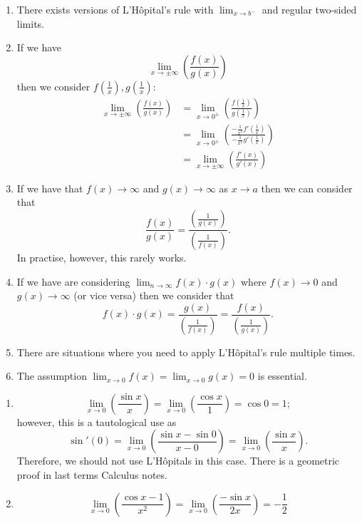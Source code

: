 \begin{remark}
    \begin{enumerate}
        \item There exists versions of L'H\^{o}pital's rule with $\lim_{x \to b^-}$ and regular two-sided limits.
        
        \item If we have \[ \lim_{x \to \pm \infty} \left( \frac{f(x)}{g(x)} \right) \] then we consider $f \left( \frac{1}{x} \right), g \left( \frac{1}{x} \right)$:
        \begin{align*}
            \lim_{x \to \pm \infty} \left( \frac{f(x)}{g(x)} \right) &= \lim_{x \to 0^{\pm}} \left( \frac{f \left( \frac{1}{x} \right)}{g \left( \frac{1}{x} \right)} \right) \\
            &= \lim_{x \to 0^{\pm}} \left( \frac{-\frac{1}{x^2} f' \left( \frac{1}{x} \right)}{-\frac{1}{x^2} g' \left( \frac{1}{x} \right)} \right) \\
            &= \lim_{x \to \pm \infty} \left( \frac{f'(x)}{g'(x)} \right)
        \end{align*}
        
        \item If we have that $f(x) \to \infty$ and $g(x) \to \infty$ as $x \to a$ then we can consider that \[ \frac{f(x)}{g(x)} = \frac{ \left( \frac{1}{g(x)} \right)}{\left( \frac{1}{f(x)} \right)}. \] In practise, however, this rarely works.
        
        \item If we have are considering $\lim_{n \to \infty} f(x) \cdot g(x)$ where $f(x) \to 0$ and $g(x) \to \infty$ (or vice versa) then we consider that \[ f(x) \cdot g(x) = \frac{g(x)}{\left( \frac{1}{f(x)} \right)} = \frac{f(x)}{\left( \frac{1}{g(x)} \right)}. \]
        
        \item There are situations where you need to apply L'H\^{o}pital's rule multiple times.
        
        \item The assumption $\lim_{x \to 0} f(x) = \lim_{x \to 0} g(x) = 0$ is essential.
    \end{enumerate}
\end{remark}

\begin{example}
    \begin{enumerate}
        \item \[ \lim_{x \to 0} \left( \frac{\sin{x}}{x} \right) = \lim_{x \to 0} \left( \frac{\cos{x}}{1} \right) = \cos{0} = 1; \] however, this is a tautological use as \[ \sin'{(0)} = \lim_{x \to 0} \left( \frac{\sin{x} - \sin{0}}{x - 0} \right) = \lim_{x \to 0} \left( \frac{\sin{x}}{x} \right). \] Therefore, we should not use L'H\^{o}pitals in this case. There is a geometric proof in last terms Calculus notes.
        
        \item \[ \lim_{x \to 0} \left( \frac{\cos{x} - 1}{x^2} \right) = \lim_{x \to 0} \left( \frac{- \sin{x}}{2x} \right) = - \frac{1}{2} \]
    \end{enumerate}
\end{example}

